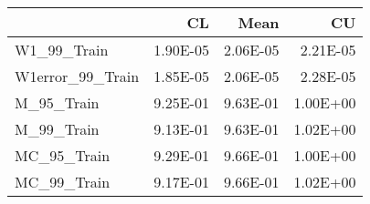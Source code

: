 \begin{tabular}{lrrr}
\toprule
{} &       CL &     Mean &       CU \\
\midrule
W1\_99\_Train      & 1.90E-05 & 2.06E-05 & 2.21E-05 \\
W1error\_99\_Train & 1.85E-05 & 2.06E-05 & 2.28E-05 \\
M\_95\_Train       & 9.25E-01 & 9.63E-01 & 1.00E+00 \\
M\_99\_Train       & 9.13E-01 & 9.63E-01 & 1.02E+00 \\
MC\_95\_Train      & 9.29E-01 & 9.66E-01 & 1.00E+00 \\
MC\_99\_Train      & 9.17E-01 & 9.66E-01 & 1.02E+00 \\
\bottomrule
\end{tabular}
